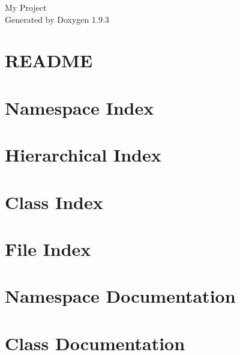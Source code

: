 \documentclass[twoside]{book}
\newcommand{\+}{\discretionary{\mbox{\scriptsize$\hookleftarrow$}}{}{}}
\newcommand{\clearemptydoublepage}{%
    \newpage{\pagestyle{empty}\cleardoublepage}%
  }
\begin{document}
  \raggedbottom
    \hypersetup{pageanchor=false,
                bookmarksnumbered=true,
                pdfencoding=unicode
               }
  \begin{titlepage}
  \vspace*{7cm}
  \begin{center}%
  {\Large My Project}\\
  \vspace*{1cm}
  {\large Generated by Doxygen 1.9.3}\\
  \end{center}
  \end{titlepage}
  \clearemptydoublepage
  \tableofcontents
  \clearemptydoublepage
  \hypersetup{pageanchor=true}
\chapter{README}
\label{md__c___users__ilya__dukhanin_source_repos__calendar__r_e_a_d_m_e}

\chapter{Namespace Index}

\chapter{Hierarchical Index}

\chapter{Class Index}

\chapter{File Index}

\chapter{Namespace Documentation}




\chapter{Class Documentation}










\end{document}
